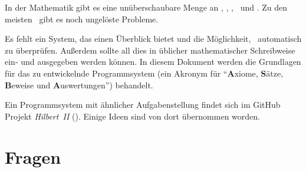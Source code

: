 In der Mathematik gibt es eine unüberschaubare Menge an \Axiomen, \Saetzen, \Beweisen, \Fachbegriffen\ und \Fachgebieten.
Zu den meisten \Fachgebieten\ gibt es noch ungelöste Probleme.

Es fehlt ein System, das einen Überblick bietet und die Möglichkeit, \Beweise\ automatisch zu überprüfen.
Außerdem sollte all dies in üblicher mathematischer Schreibweise ein- und ausgegeben werden können.
In diesem Dokument werden die Grundlagen für das zu entwickelnde Programmsystem  (ein Akronym für "`\textbf{A}xiome, \textbf{S}ätze, \textbf{B}eweise und \textbf{A}uswertungen"') behandelt.

Ein Programmsystem mit ähnlicher Aufgabenstellung findet sich im GitHub Projekt \emph{Hilbert~II} (\cite{bib:HilbertII, bib:qedeq}).
Einige Ideen sind von dort übernommen worden.

\section     {Fragen}%
\label   {sec:Fragen}

